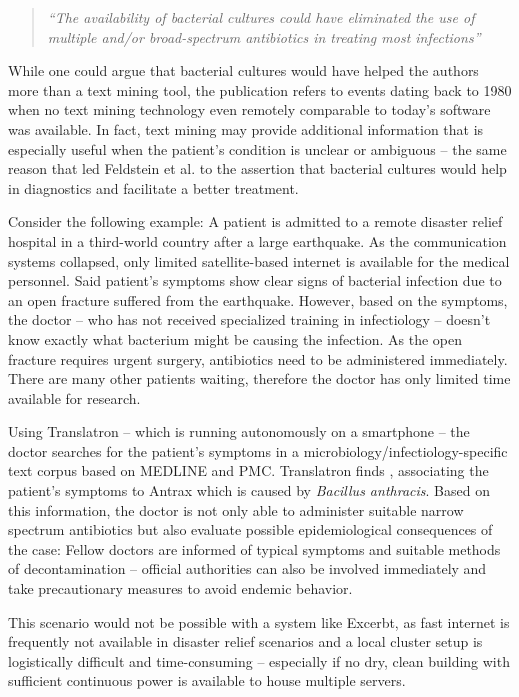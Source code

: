 \documentclass[a4paper, 12pt, twoside, reqn]{report}
\numberwithin{figure}{chapter}
\newtheorem[L]{boxedDefinition}{Definition}
\newtheorem[L]{boxedExample}{Example}
\newcommand{\itquote}[1]{\textit{{``}#1{''}}}
\begin{document}
\begin{quote}
  \itquote{The availability of bacterial cultures could have eliminated the use of multiple and/or broad-spectrum antibiotics in treating most infections} \cite[discussion]{feldstein1982cambodian}
\end{quote}

While one could argue that bacterial cultures would have helped the authors more than a text mining tool, the publication refers to events dating back to 1980 when no text mining technology even remotely comparable to today's software was available. In fact, text mining may provide additional information that is especially useful when the patient's condition is unclear or ambiguous -- the same reason that led Feldstein et al. to the assertion that bacterial cultures would help in diagnostics and facilitate a better treatment.

Consider the following example: A patient is admitted to a remote disaster relief hospital in a third-world country after a large earthquake. As the communication systems collapsed, only limited satellite-based internet is available for the medical personnel. Said patient's symptoms show clear signs of bacterial infection due to an open fracture suffered from the earthquake. However, based on the symptoms, the doctor -- who has not received specialized training in infectiology -- doesn't know exactly what bacterium might be causing the infection. As the open fracture requires urgent surgery, antibiotics need to be administered immediately. There are many other patients waiting, therefore the doctor has only limited time available for research.

Using Translatron -- which is running autonomously on a smartphone -- the doctor searches for the patient's symptoms in a microbiology/infectiology-specific text corpus based on MEDLINE and PMC. Translatron finds \cite{inglesby2002anthrax}, associating the patient's symptoms to Antrax which is caused by \textit{Bacillus anthracis}. Based on this information, the doctor is not only able to administer suitable narrow spectrum antibiotics but also evaluate possible epidemiological consequences of the case: Fellow doctors are informed of typical symptoms and suitable methods of decontamination -- official authorities can also be involved immediately and take precautionary measures to avoid endemic behavior.

This scenario would not be possible with a system like Excerbt, as fast internet is frequently not available in disaster relief scenarios and a local cluster setup is logistically difficult and time-consuming -- especially if no dry, clean building with sufficient continuous power is available to house multiple servers.
\end{document}
